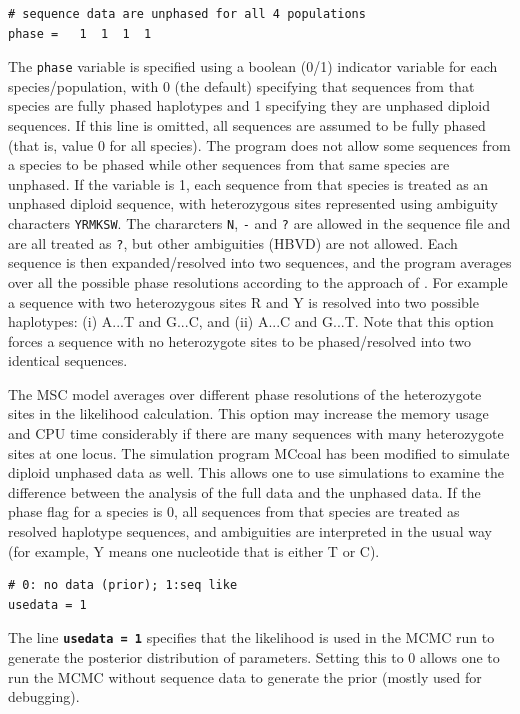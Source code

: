 \documentclass{book}
\numberwithin{equation}{section} \renewcommand{\baselinestretch}{0.55}
\begin{document}
\begin{verbatim}
# sequence data are unphased for all 4 populations
phase =   1  1  1  1
\end{verbatim}
The \texttt{phase} variable is specified using a boolean (0/1)
indicator variable for each species/population, with 0 (the default)
specifying that sequences from that species are fully phased
haplotypes and 1 specifying they are unphased diploid sequences.  If
this line is omitted, all sequences are assumed to be fully phased
(that is, value 0 for all species).  The program does not allow some
sequences from a species to be phased while other sequences from that
same species are unphased.  If the variable is 1, each sequence from
that species is treated as an unphased diploid sequence, with
heterozygous sites represented using ambiguity characters
\texttt{YRMKSW}. The chararcters \texttt{N}, \texttt{-} and \texttt{?}
are allowed in the sequence file and are all treated as \texttt{?},
but other ambiguities (HBVD) are not allowed.  Each sequence is then
expanded/resolved into two sequences, and the program averages over
all the possible phase resolutions according to the approach of
\citet{Gronau2011}.  For example a sequence with two heterozygous
sites R and Y is resolved into two possible haplotypes: (i) A...T and
G...C, and (ii) A...C and G...T.  Note that this option forces a
sequence with no heterozygote sites to be phased/resolved into two
identical sequences.

The MSC model averages over different phase resolutions of the
heterozygote sites in the likelihood calculation.  This option may
increase the memory usage and CPU time considerably if there are many
sequences with many heterozygote sites at one locus.  The simulation
program MCcoal has been modified to simulate diploid unphased data as
well.  This allows one to use simulations to examine the difference
between the analysis of the full data and the unphased data.  If the
phase flag for a species is 0, all sequences from that species are
treated as resolved haplotype sequences, and ambiguities are
interpreted in the usual way (for example, Y means one nucleotide that
is either T or C).

\begin{verbatim}
# 0: no data (prior); 1:seq like
usedata = 1  
\end{verbatim}
The line \texttt{\textbf{usedata = 1}} specifies that the likelihood
is used in the MCMC run to generate the posterior distribution of
parameters. Setting this to 0 allows one to run the MCMC without
sequence data to generate the prior (mostly used for debugging).
\end{document}
